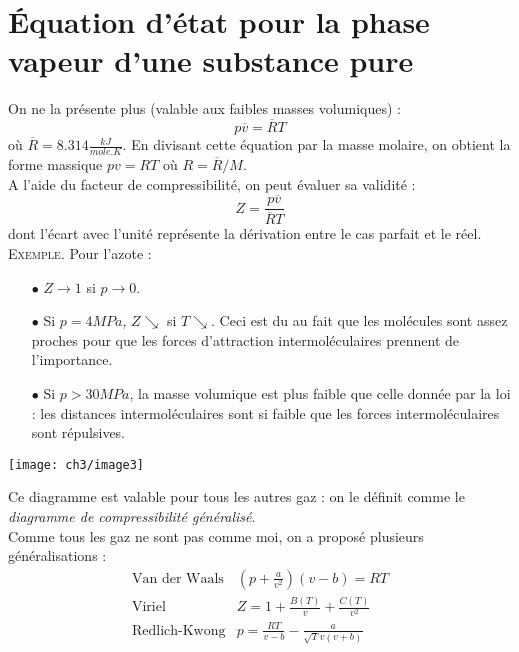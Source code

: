 \section{Équation d'état pour la phase vapeur d'une substance pure}
On ne la présente plus (valable aux faibles masses volumiques) :
\begin{equation}
	p\overline{v} = \overline{R}T
\end{equation}
où $\overline{R} = 8.314 \frac{kJ}{mole.K}$. En divisant cette 
équation par la masse molaire, on obtient la forme massique $pv = 
RT$ où $R = \overline{R}/M$.\\
A l'aide du facteur de compressibilité, on peut évaluer sa 
validité :
\begin{equation}
	Z = \frac{p\overline{v}}{\overline{R}T}
\end{equation}
dont l'écart avec l'unité représente la dérivation entre le cas 
parfait et le réel.\\

\textsc{Exemple}. Pour l'azote :
\begin{itemize}
	\item[$\bullet$] $Z \rightarrow 1$ si $p \rightarrow 0$.
	\item[$\bullet$] Si $p = 4MPa$, $Z \searrow$ si $T \searrow$. Ceci 
	      est du au fait que les molécules sont assez proches pour que les 
	      forces d'attraction intermoléculaires prennent de l'importance.
	\item[$\bullet$] Si $p > 30MPa$, la masse volumique est plus faible 
	      que celle donnée par la loi : les distances intermoléculaires sont 
	      si faible que les forces intermoléculaires sont répulsives.
\end{itemize}
\begin{center}
	\texttt{[image: ch3/image3]}
\end{center}
Ce diagramme est valable pour tous les autres gaz : on le définit 
comme le \textit{diagramme de compressibilité généralisé}.\\

Comme tous les gaz ne sont pas comme moi, on a proposé plusieurs 
généralisations :
\begin{equation}
	\begin{array}{ll}
		\text{Van der Waals} & \left(p+\frac{a}{v^2}\right)(v-b) = RT      \\
		\text{Viriel}        & Z = 1+\frac{B(T)}{v} + \frac{C(T)}{v^2}     \\
		\text{Redlich-Kwong} & p = \frac{RT}{v-b}-\frac{a}{\sqrt{T}v(v+b)} 
	\end{array}
\end{equation}


